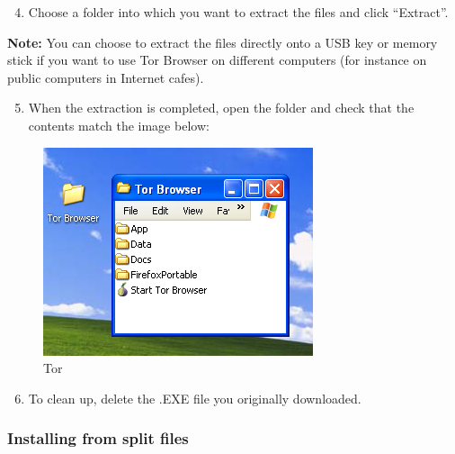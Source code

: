 \begin{enumerate}[1.]
\setcounter{enumi}{3}
\item
  Choose a folder into which you want to extract the files and click
  ``Extract''.
\end{enumerate}
\textbf{Note:} You can choose to extract the files directly onto a USB
key or memory stick if you want to use Tor Browser on different
computers (for instance on public computers in Internet cafes).

\begin{enumerate}[1.]
\setcounter{enumi}{4}
\item
  When the extraction is completed, open the folder and check that the
  contents match the image below:
\end{enumerate}
\begin{figure}[htbp]
\centering
\includegraphics{tor_3.png}
\caption{Tor}
\end{figure}

\begin{enumerate}[1.]
\setcounter{enumi}{5}
\item
  To clean up, delete the .EXE file you originally downloaded.
\end{enumerate}
\subsubsection{Installing from split files}

